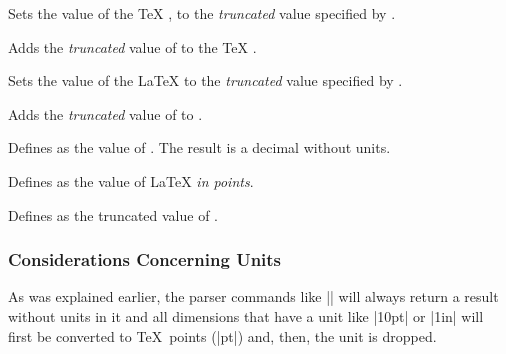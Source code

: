 \begin{command}{\pgfmathsetcount{}}
    Sets the value of the \TeX{} , to the \emph{truncated}
    value specified by .
\end{command}

\begin{command}{\pgfmathaddtocount{}}
    Adds the \emph{truncated} value of  to the \TeX{}
    .
\end{command}

\begin{command}{\pgfmathsetcounter{}}
    Sets the value of the \LaTeX{}  to the \emph{truncated} value
    specified by .
\end{command}

\begin{command}{\pgfmathaddtocounter{}}
    Adds the \emph{truncated} value of  to .
\end{command}

\begin{command}{\pgfmathsetmacro{}}
    Defines  as the value of . The result is a
    decimal without units.
\end{command}

\begin{command}{\pgfmathsetlengthmacro{}}
    Defines  as the value of  \LaTeX{} \emph{in
    points}.
\end{command}

\begin{command}{\pgfmathtruncatemacro{}}
    Defines  as the truncated value of .
\end{command}


\subsubsection{Considerations Concerning Units}
\label{pgfmath-units}

As was explained earlier, the parser commands like |\pgfmathparse| will always
return a result without units in it and all dimensions that have a unit like
|10pt| or |1in| will first be converted to \TeX\ points (|pt|) and, then, the
unit is dropped.

